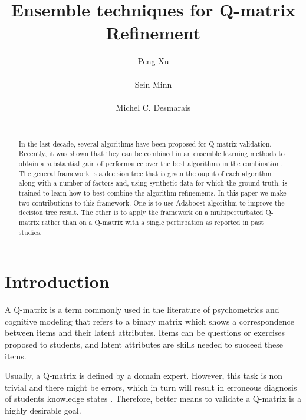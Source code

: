 \documentclass{edm_template}
\begin{document}
\title{Ensemble techniques for Q-matrix Refinement}
\author{
\alignauthor
Peng Xu\\
       \\
\alignauthor
Sein Minn\\
       \\
\alignauthor
Michel C. Desmarais\\
       \\
}
\maketitle

\begin{abstract}
In the last decade, several algorithms have been proposed for Q-matrix validation.  Recently, it was shown that they can be combined in an ensemble learning methods to obtain a substantial gain of performance over the best algorithms in the combination. The general framework is a decision tree that is given the ouput of each algorithm along with a number of factors and, using synthetic data for which the ground truth, is trained to learn how to best combine the algorithm refinements. In this paper we make two contributions to this framework. One is to use Adaboost algorithm to improve the decision tree result. The other is to apply the framework on a multiperturbated Q-matrix rather than on a Q-matrix with a single pertirbation as reported in past studies.
\end{abstract}
\section{Introduction}
A Q-matrix is a term commonly used in the literature of psychometrics and cognitive modeling that refers to a binary matrix which shows a correspondence between items and their latent attributes. Items can be questions or exercises proposed to students, and latent attributes are skills needed to succeed these items.

 Usually, a Q-matrix is defined by a domain expert. However, this task is non trivial and there might be errors, which in turn will result in erroneous diagnosis of students knowledge states \cite{rupp2008effects,madison2015effects}. Therefore, better means to validate a Q-matrix is a highly desirable goal.
\end{document}

